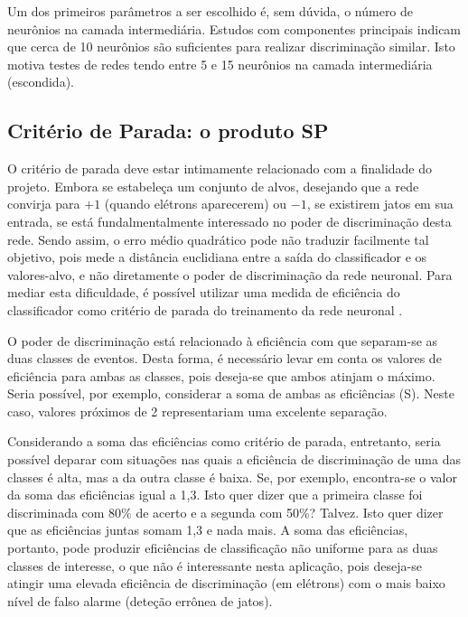 Um dos primeiros parâmetros a ser escolhido é, sem dúvida, o número de
neurônios na camada intermediária. Estudos com componentes principais
\cite{seixas:pca} indicam que cerca de 10 neurônios são suficientes para
realizar discriminação similar. Isto motiva testes de redes tendo entre 5 e 15
neurônios na camada intermediária (escondida).

\subsection{Critério de Parada: o produto SP}
\label{sec:sp}

O critério de parada deve estar intimamente relacionado com a finalidade do
projeto. Embora se estabeleça um conjunto de alvos, desejando que a rede
convirja para $+1$ (quando elétrons aparecerem) ou $-1$, se existirem jatos em
sua entrada, se está fundalmentalmente interessado no poder de discriminação
desta rede. Sendo assim, o erro médio quadrático pode não traduzir facilmente
tal objetivo, pois mede a distância euclidiana entre a saída do classificador
e os valores-alvo, e não diretamente o poder de discriminação da rede
neuronal. Para mediar esta dificuldade, é possível utilizar uma medida de
eficiência do classificador como critério de parada do treinamento da rede
neuronal
\cite{haykin}. 

O poder de discriminação está relacionado à eficiência com que separam-se as
duas classes de eventos. Desta forma, é necessário levar em conta os valores de
eficiência para ambas as classes, pois deseja-se que ambos atinjam o
máximo. Seria possível, por exemplo, considerar a soma de ambas as eficiências
(S). Neste caso, valores próximos de 2 representariam uma excelente separação.

Considerando a soma das eficiências como critério de parada, entretanto, seria
possível deparar com situações nas quais a eficiência de discriminação de uma
das classes é alta, mas a da outra classe é baixa. Se, por exemplo,
encontra-se o valor da soma das eficiências igual a 1,3. Isto quer dizer que a
primeira classe foi discriminada com 80\% de acerto e a segunda com 50\%?
Talvez. Isto quer dizer que as eficiências juntas somam 1,3 e nada mais. A
soma das eficiências, portanto, pode produzir eficiências de classificação não
uniforme para as duas classes de interesse, o que não é interessante nesta
aplicação, pois deseja-se atingir uma elevada eficiência de discriminação (em
elétrons) com o mais baixo nível de falso alarme (deteção errônea de jatos).

